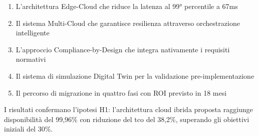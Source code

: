 \begin{enumerate}
    \item L'architettura Edge-Cloud che riduce la latenza al 99° percentile a 67ms
    \item Il sistema Multi-Cloud che garantisce resilienza attraverso orchestrazione intelligente
    \item L'approccio Compliance-by-Design che integra nativamente i requisiti normativi
    \item Il sistema di simulazione Digital Twin per la validazione pre-implementazione
    \item Il percorso di migrazione in quattro fasi con ROI previsto in 18 mesi
\end{enumerate}

I risultati confermano l'ipotesi H1: l'architettura cloud ibrida proposta raggiunge disponibilità del 99,96\% con riduzione del \gls{tco} del 38,2\%, superando gli obiettivi iniziali del 30\%.

%
